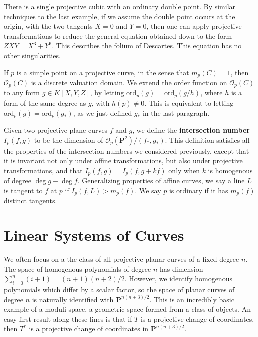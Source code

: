 \begin{example}
    There is a single projective cubic with an ordinary double point. By similar techniques to the last example, if we assume the double point occurs at the origin, with the two tangents $X = 0$ and $Y = 0$, then one can apply projective transformations to reduce the general equation obtained down to the form $ZXY = X^3 + Y^3$. This describes the folium of Descartes. This equation has no other singularities.
\end{example}

If $p$ is a simple point on a projective curve, in the sense that $m_p(C) = 1$, then $\mathcal{O}_p(C)$ is a discrete valuation domain. We extend the order function on $\mathcal{O}_p(C)$ to any form $g \in K[X,Y,Z]$, by letting $\text{ord}_p(g) = \text{ord}_p(g/h)$, where $h$ is a form of the same degree as $g$, with $h(p) \neq 0$. This is equivalent to letting $\text{ord}_p(g) = \text{ord}_p(g_*)$, as we just defined $g_*$ in the last paragraph.

Given two projective plane curves $f$ and $g$, we define the {\bf intersection number} $I_p(f,g)$ to be the dimension of $\mathcal{O}_p(\mathbf{P}^2)/(f_*,g_*)$. This definition satisfies all the properties of the intersection numbers we considered previously, except that it is invariant not only under affine transformations, but also under projective transformations, and that $I_p(f,g) = I_p(f,g + kf)$ only when $k$ is homogenous of degree $\deg g - \deg f$. Generalizing properties of affine curves, we say a line $L$ is tangent to $f$ at $p$ if $I_p(f,L) > m_p(f)$. We say $p$ is ordinary if it has $m_p(f)$ distinct tangents.

\section{Linear Systems of Curves}

We often focus on a the class of all projective planar curves of a fixed degree $n$. The space of homogenous polynomials of degree $n$ has dimension $\sum_{i = 0}^n (i+1) = (n+1)(n+2)/2$. However, we identify homogenous polynomials which differ by a scalar factor, so the space of planar curves of degree $n$ is naturally identified with $\mathbf{P}^{n(n+3)/2}$. This is an incredibly basic example of a moduli space, a geometric space formed from a class of objects. An easy first result along these lines is that if $T$ is a projective change of coordinates, then $T^*$ is a projective change of coordinates in $\mathbf{P}^{n(n+3)/2}$.

